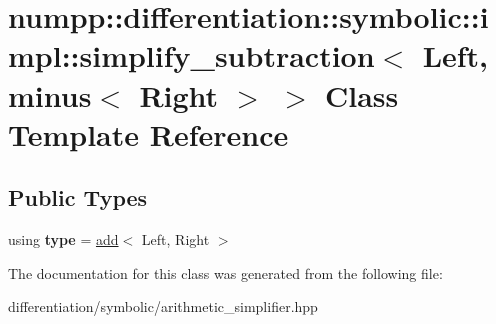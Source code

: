 \hypertarget{classnumpp_1_1differentiation_1_1symbolic_1_1impl_1_1simplify__subtraction_3_01Left_00_01minus_3_01Right_01_4_01_4}{}\section{numpp\+:\+:differentiation\+:\+:symbolic\+:\+:impl\+:\+:simplify\+\_\+subtraction$<$ Left, minus$<$ Right $>$ $>$ Class Template Reference}
\label{classnumpp_1_1differentiation_1_1symbolic_1_1impl_1_1simplify__subtraction_3_01Left_00_01minus_3_01Right_01_4_01_4}
\subsection*{Public Types}
\begin{DoxyCompactItemize}
\item 
\mbox{\label{classnumpp_1_1differentiation_1_1symbolic_1_1impl_1_1simplify__subtraction_3_01Left_00_01minus_3_01Right_01_4_01_4_a8e36ee8dac0aa19ce63c4474094422e9}} 
using {\bfseries type} = \hyperlink{classnumpp_1_1differentiation_1_1symbolic_1_1add}{add}$<$ Left, Right $>$
\end{DoxyCompactItemize}


The documentation for this class was generated from the following file\+:\begin{DoxyCompactItemize}
\item 
differentiation/symbolic/arithmetic\+\_\+simplifier.\+hpp\end{DoxyCompactItemize}
